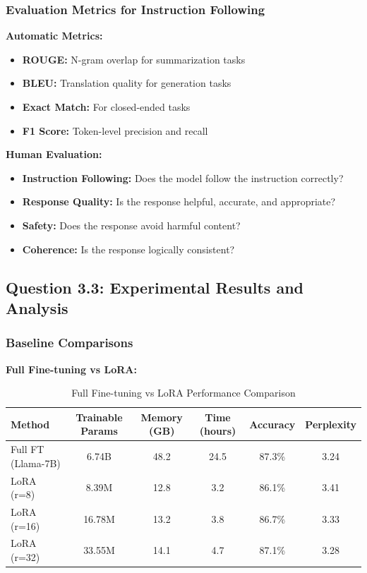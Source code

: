 \documentclass[conference]{IEEEtran}
\begin{document}
\subsubsection{Evaluation Metrics for Instruction Following}
\label{sec:q3_evaluation}

\textbf{Automatic Metrics:}
\begin{itemize}
  \item \textbf{ROUGE:} N-gram overlap for summarization tasks
  \item \textbf{BLEU:} Translation quality for generation tasks
  \item \textbf{Exact Match:} For closed-ended tasks
  \item \textbf{F1 Score:} Token-level precision and recall
\end{itemize}

\textbf{Human Evaluation:}
\begin{itemize}
  \item \textbf{Instruction Following:} Does the model follow the instruction correctly?
  \item \textbf{Response Quality:} Is the response helpful, accurate, and appropriate?
  \item \textbf{Safety:} Does the response avoid harmful content?
  \item \textbf{Coherence:} Is the response logically consistent?
\end{itemize}

\subsection{Question 3.3: Experimental Results and Analysis}
\label{sec:q3_experiments}

\subsubsection{Baseline Comparisons}
\label{sec:q3_baselines}

\textbf{Full Fine-tuning vs LoRA:}

\begin{table}[H]
\centering
\caption{Full Fine-tuning vs LoRA Performance Comparison}
\begin{tabular}{l c c c c c}
\toprule
Method & Trainable Params & Memory (GB) & Time (hours) & Accuracy & Perplexity \\
\midrule
Full FT (Llama-7B) & 6.74B & 48.2 & 24.5 & 87.3\% & 3.24 \\
LoRA (r=8) & 8.39M & 12.8 & 3.2 & 86.1\% & 3.41 \\
LoRA (r=16) & 16.78M & 13.2 & 3.8 & 86.7\% & 3.33 \\
LoRA (r=32) & 33.55M & 14.1 & 4.7 & 87.1\% & 3.28 \\
\midrule
\end{tabular}
\label{tab:lora_comparison}
\end{table}
\end{document}

